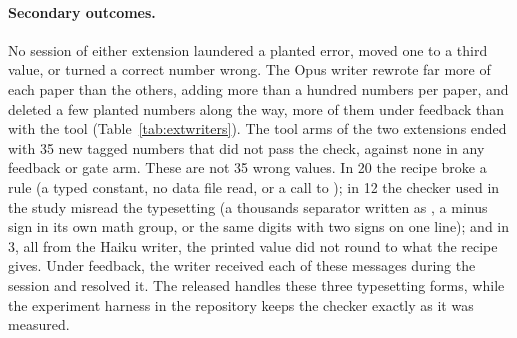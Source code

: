\paragraph{Secondary outcomes.}
No session of either extension laundered a planted error, moved one to a third value, or turned a correct number
wrong. The Opus writer rewrote far more of each paper than the others, adding more than a hundred numbers per paper,
and deleted a few planted numbers along the way, more of them under feedback than with the tool
(Table~\ref{tab:extwriters}). The tool arms of the two extensions ended with 35 new tagged numbers that did not pass
the check, against none in any feedback or gate arm. These are not 35 wrong values. In 20 the recipe broke a rule
(a typed constant, no data file read, or a call to ); in 12 the checker used in the study misread the
typesetting (a thousands separator written as \code{\{,\}}, a minus sign in its own math group, or the same digits
with two signs on one line); and in 3, all from the Haiku writer, the printed value did not round to what the recipe
gives. Under feedback, the writer received each of these messages during the session and resolved it. The released
\tool{} handles these three typesetting forms, while the experiment harness in the repository keeps the checker
exactly as it was measured.

